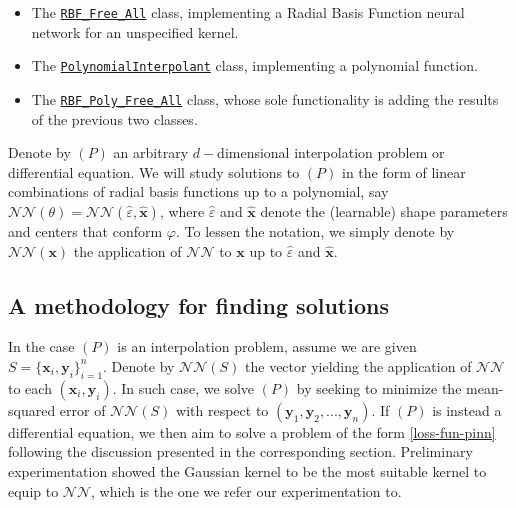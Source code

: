 \documentclass[12pt]{report} %
\newcommand{\tmmathbf}[1]{\ensuremath{\boldsymbol{#1}}}
\begin{document}
\begin{itemize}
  \item The \href{https://github.com/heqro/tfm-experiments/blob/4fd010c560a247b00def20dd94d1f984d7992a24/modules/nn_rbf.py\#L6}{\texttt{RBF\_Free\_All}} class, implementing a Radial Basis Function neural network for an unspecified kernel.
  \item The \href{https://github.com/heqro/tfm-experiments/blob/4fd010c560a247b00def20dd94d1f984d7992a24/modules/nn_poly.py#L6}{\texttt{PolynomialInterpolant}} class, implementing a polynomial function.
  \item The \href{https://github.com/heqro/tfm-experiments/blob/4fd010c560a247b00def20dd94d1f984d7992a24/modules/nn_rbf_poly.py#L8}{\texttt{RBF\_Poly\_Free\_All}} class, whose sole functionality is adding the results of the previous two classes.
\end{itemize}

Denote by $(P)$  an arbitrary $d-$dimensional interpolation problem or differential equation. We will study solutions to $(P)$ in the form of linear combinations of radial basis functions up to a polynomial, say $\mathcal{NN}(\theta) = \mathcal{NN}(\hat{\varepsilon}, \hat{\tmmathbf{x}})$, where $\hat{\varepsilon}$ and $\hat{\tmmathbf{x}}$ denote the (learnable) shape parameters and centers that conform $\varphi$. To lessen the notation, we simply denote by $\mathcal{NN}(\tmmathbf{x})$ the application of $\mathcal{NN}$ to $\tmmathbf{x}$ up to $\hat{\varepsilon}$ and $\hat{\tmmathbf{x}}$.

\subsection{A methodology for finding solutions}

In the case $(P)$ is an interpolation problem, assume we are given $S = \{\tmmathbf{x}_i, \tmmathbf{y}_i\}_{i=1}^n$. Denote by $\mathcal{NN}(S)$ the vector yielding the application of $\mathcal{NN}$ to each $(\tmmathbf{x}_i, \tmmathbf{y}_i)$. In such case, we solve $(P)$ by seeking to minimize the mean-squared error of $\mathcal{NN}(S)$ with respect to $(\tmmathbf{y}_1, \tmmathbf{y}_2, ..., \tmmathbf{y}_n)$. If $(P)$ is instead a differential equation, we then aim to solve a problem of the form \eqref{loss-fun-pinn} following the discussion presented in the corresponding section. Preliminary experimentation showed the Gaussian kernel to be the most suitable kernel to equip to $\mathcal{NN}$, which is the one we refer our experimentation to.
\end{document}
